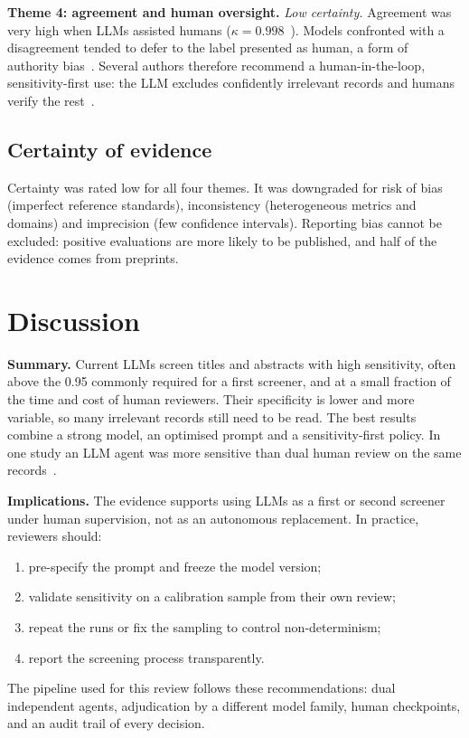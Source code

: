 \documentclass[12pt,a4paper]{article}
\begin{document}
\textbf{Theme 4: agreement and human oversight.} \emph{Low certainty.} Agreement was very high
when LLMs assisted humans ($\kappa=0.998$~\cite{s034}). Models confronted with a disagreement
tended to defer to the label presented as human, a form of authority bias~\cite{s035}. Several
authors therefore recommend a human-in-the-loop, sensitivity-first use: the LLM excludes
confidently irrelevant records and humans verify the rest~\cite{s010,s035,s037}.

\subsection{Certainty of evidence}
Certainty was rated low for all four themes. It was downgraded for risk of bias (imperfect
reference standards), inconsistency (heterogeneous metrics and domains) and imprecision
(few confidence intervals). Reporting bias cannot be excluded: positive evaluations are more
likely to be published, and half of the evidence comes from preprints.

\section{Discussion}
\textbf{Summary.} Current LLMs screen titles and abstracts with high sensitivity, often above
the 0.95 commonly required for a first screener, and at a small fraction of the time and cost
of human reviewers. Their specificity is lower and more variable, so many irrelevant records
still need to be read. The best results combine a strong model, an optimised prompt and a
sensitivity-first policy. In one study an LLM agent was more sensitive than dual human review
on the same records~\cite{s031}.

\textbf{Implications.} The evidence supports using LLMs as a first or second screener under
human supervision, not as an autonomous replacement. In practice, reviewers should:
\begin{enumerate}[label=(\arabic*),leftmargin=2.2em,itemsep=2pt,topsep=2pt,parsep=0pt]
\item pre-specify the prompt and freeze the model version;
\item validate sensitivity on a calibration sample from their own review;
\item repeat the runs or fix the sampling to control non-determinism;
\item report the screening process transparently.
\end{enumerate}
The pipeline used for this review follows these recommendations: dual independent agents,
adjudication by a different model family, human checkpoints, and an audit trail of every
decision.
\end{document}
